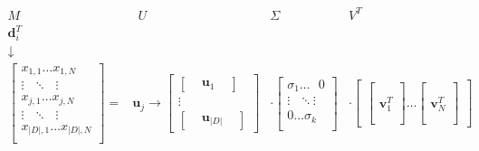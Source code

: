 $$
\begin{matrix} 
 M &  ~~ U & \Sigma & V^T \\
 \textbf{d}_i^T &  & &  \\
 \downarrow &  & &  \\
\begin{bmatrix}
x_{1,1} \dots  x_{1,N} \\
\vdots ~~~  \ddots ~~~ \vdots \\
x_{j,1} \dots  x_{j,N} \\
\vdots ~~~ \ddots ~~~ \vdots \\
x_{|D|,1} \dots  x_{|D|,N} \\
\end{bmatrix}
=
&
\textbf{u}_j \rightarrow
\begin{bmatrix} 
\begin{bmatrix} & \textbf{u}_1 & \end{bmatrix} \\
\vdots \\
\begin{bmatrix} & \textbf{u}_{|D|} & \end{bmatrix}
\end{bmatrix}
&
\cdot
\begin{bmatrix} 
\sigma_1 \dots ~~~ 0 \\
\vdots ~~~ \ddots  \vdots \\
0  \dots  \sigma_k \\
\end{bmatrix}
&
\cdot
\begin{bmatrix} 
\begin{bmatrix} \, \\ \, \\ \textbf{v}_1^T \\ \, \\ \,\end{bmatrix} 
\dots
\begin{bmatrix} \, \\ \, \\ \textbf{v}_N^T \\ \, \\ \, \end{bmatrix}
\end{bmatrix}
\end{matrix}
$$